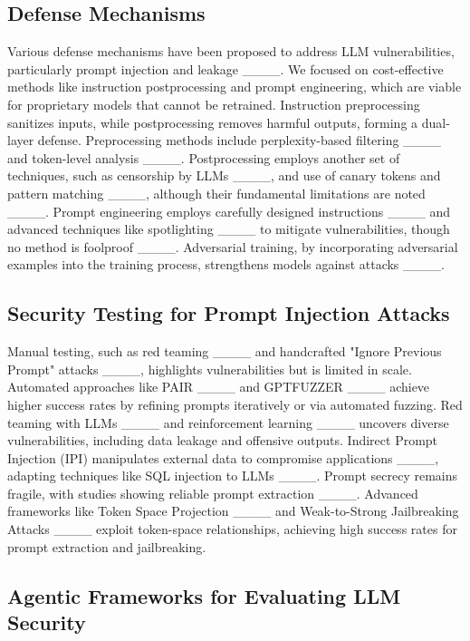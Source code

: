 \subsection{Defense Mechanisms}

Various defense mechanisms have been proposed to address LLM vulnerabilities, particularly prompt injection and leakage ____. We focused on cost-effective methods like instruction postprocessing and prompt engineering, which are viable for proprietary models that cannot be retrained. Instruction preprocessing sanitizes inputs, while postprocessing removes harmful outputs, forming a dual-layer defense. Preprocessing methods include perplexity-based filtering ____ and token-level analysis ____. Postprocessing employs another set of techniques, such as censorship by LLMs ____, and use of canary tokens and pattern matching ____, although their fundamental limitations are noted ____. Prompt engineering employs carefully designed instructions ____ and advanced techniques like spotlighting ____ to mitigate vulnerabilities, though no method is foolproof ____. Adversarial training, by incorporating adversarial examples into the training process, strengthens models against attacks ____.

\subsection{Security Testing for Prompt Injection Attacks}

Manual testing, such as red teaming ____ and handcrafted "Ignore Previous Prompt" attacks ____, highlights vulnerabilities but is limited in scale. Automated approaches like PAIR ____ and GPTFUZZER ____ achieve higher success rates by refining prompts iteratively or via automated fuzzing. Red teaming with LLMs ____ and reinforcement learning ____ uncovers diverse vulnerabilities, including data leakage and offensive outputs. Indirect Prompt Injection (IPI) manipulates external data to compromise applications ____, adapting techniques like SQL injection to LLMs ____. Prompt secrecy remains fragile, with studies showing reliable prompt extraction ____. Advanced frameworks like Token Space Projection ____ and Weak-to-Strong Jailbreaking Attacks ____ exploit token-space relationships, achieving high success rates for prompt extraction and jailbreaking.

\subsection{Agentic Frameworks for Evaluating LLM Security}

